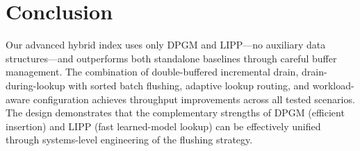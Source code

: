 \documentclass[11pt]{article}
\begin{document}
\section{Conclusion}

Our advanced hybrid index uses only DPGM and LIPP---no auxiliary data structures---and outperforms both standalone baselines through careful buffer management. The combination of double-buffered incremental drain, drain-during-lookup with sorted batch flushing, adaptive lookup routing, and workload-aware configuration achieves throughput improvements across all tested scenarios. The design demonstrates that the complementary strengths of DPGM (efficient insertion) and LIPP (fast learned-model lookup) can be effectively unified through systems-level engineering of the flushing strategy.
\end{document}
